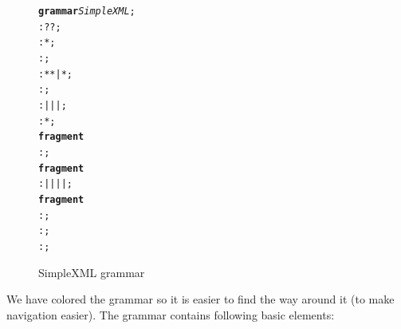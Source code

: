 \begin{figure}[ht]
\centering
\begin{framed}
\begin{alltt}
	\textbf{grammar} \textit{SimpleXML};
	  : ? ?  ;
	    :  *  ;
	   : \antlrliteral{<!--}  \antlrliteral{-->} ;
	   : \antlrliteral{<}  * \antlrliteral{>} * \antlrliteral{</}  \antlrliteral{>} | \antlrliteral{<}  * \antlrliteral{/>} ;
	    :     ;
	   :  |  |  |  ;
	      :  * ;
	\textbf{fragment}
	     : \antlrregex{[0-9]} ;
	\textbf{fragment}
	  :  | \antlrliteral{-} | \antlrliteral{_} |  |  ;
	\textbf{fragment}
	 : \antlrregex{[:a-zA-Z]} ;
	      : \antlrregex{~[<"]*} ;
	     : \antlrliteral{<![CDATA[}  \antlrliteral{]]>} ;
\end{alltt}
\end{framed}
\caption{SimpleXML grammar}
\end{figure}

We have colored the grammar so it is easier to find the way around it (to make navigation easier).
The grammar contains following basic elements:

